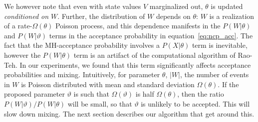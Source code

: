 We however note that even with state values $V$ marginalized out, $\theta$ is updated {\em conditioned on $W$}. 
Further, the distribution of $W$ depends on $\theta$: $W$ is a realization of a rate-$\Omega(\theta)$ Poisson process, and this dependence manifests in the $P(W|\theta)$ and $P(W|\vartheta)$ terms in the acceptance probability in equation~\eqref{eq:ncp_acc}. 
The fact that the MH-acceptance probability involves a $P(X|\theta)$ term is inevitable, however the $P(W|\theta)$ term is an artifact of the computational algorithm of Rao-Teh. 
In our experiments, we found that this term significantly affects acceptance probabilities and mixing. 
Intuitively, for parameter $\theta$, $|W|$, the number of events in $W$ is Poisson distributed with mean and standard deviation $\Omega(\theta)$. 
If the proposed parameter $\vartheta$ is such that $\Omega(\vartheta)$ is half $\Omega(\theta)$, then the ratio $P(W|\vartheta)/P(W|\theta)$ will be small, so that $\vartheta$ is unlikely to be accepted. 
This will slow down mixing.
The next section describes our algorithm that get around this.
